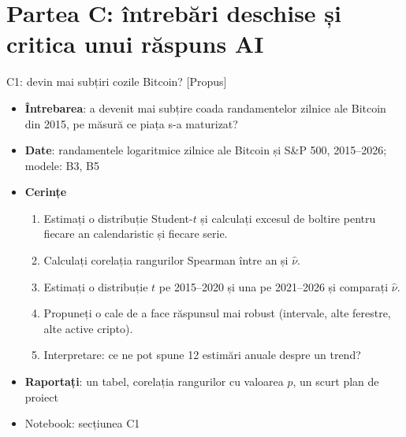 \section{Partea C: întrebări deschise și critica unui răspuns AI}

\begin{frame}{C1: devin mai subțiri cozile Bitcoin? [Propus]}
\itemsize{\footnotesize}
\begin{itemize}
\item \textbf{Întrebarea}: a devenit mai subțire coada randamentelor zilnice ale Bitcoin din 2015, pe măsură ce piața s-a maturizat?
\item \textbf{Date}: randamentele logaritmice zilnice ale Bitcoin și S\&P 500, 2015--2026; modele: B3, B5
\item \textbf{Cerințe}
\begin{enumerate}
    \item Estimați o distribuție Student-$t$ și calculați excesul de boltire pentru fiecare an calendaristic și fiecare serie.
    \item Calculați corelația rangurilor Spearman între an și $\hat\nu$.
    \item Estimați o distribuție $t$ pe 2015--2020 și una pe 2021--2026 și comparați $\hat\nu$.
    \item Propuneți o cale de a face răspunsul mai robust (intervale, alte ferestre, alte active cripto).
    \item Interpretare: ce ne pot spune 12 estimări anuale despre un trend?
\end{enumerate}
\item \textbf{Raportați}: un tabel, corelația rangurilor cu valoarea $p$, un scurt plan de proiect
\item Notebook: secțiunea C1
\end{itemize}
\end{frame}

